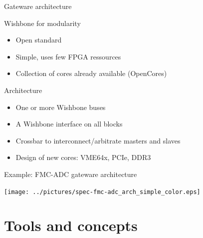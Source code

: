 \documentclass[compress,red]{beamer}
\begin{document}
\begin{frame}{Gateware architecture}

  \begin{block}{Wishbone for modularity}
    \begin{itemize}
    \item Open standard
    \item Simple, uses few FPGA ressources
    \item Collection of cores already available (OpenCores)
    \end{itemize}
  \end{block}

  \begin{block}{Architecture}
    \begin{itemize}
    \item One or more Wishbone buses
    \item A Wishbone interface on all blocks
    \item Crossbar to interconnect/arbitrate masters and slaves %
    \item Design of new cores: VME64x, PCIe, DDR3
    \end{itemize}
  \end{block}

  \note[item]{}

\end{frame}

\begin{frame}{Example: FMC-ADC gateware architecture}

  \begin{center}
    \texttt{[image: ../pictures/spec-fmc-adc\_arch\_simple\_color.eps]}
  \end{center}

  \note[item]{}

\end{frame}


\section{Tools and concepts}

\subsection*{} %
\end{document}
